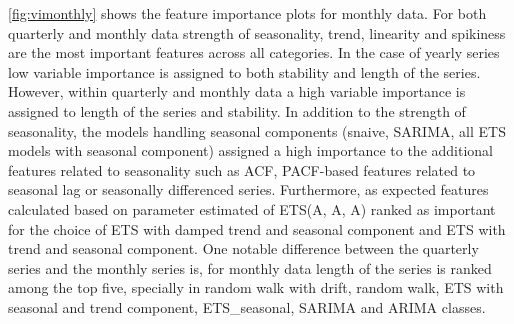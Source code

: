 \documentclass[11pt,a4paper,]{article}
\begin{document}
\autoref{fig:vimonthly} shows the feature importance plots for monthly data. For both quarterly and monthly data strength of seasonality, trend, linearity and spikiness are the most important features across all categories. In the case of yearly series low variable importance is assigned to both stability and length of the series. However, within quarterly and monthly data a high variable importance is assigned to length of the series and stability. In addition to the strength of seasonality, the models handling seasonal components (snaive, SARIMA, all ETS models with seasonal component) assigned a high importance to the additional features related to seasonality such as ACF, PACF-based features related to seasonal lag or seasonally differenced series. Furthermore, as expected features calculated based on parameter estimated of ETS(A, A, A) ranked as important for the choice of ETS with damped trend and seasonal component and ETS with trend and seasonal component. One notable difference between the quarterly series and the monthly series is, for monthly data length of the series is ranked among the top five, specially in random walk with drift, random walk, ETS with seasonal and trend component, ETS\_seasonal, SARIMA and ARIMA classes.
\end{document}
